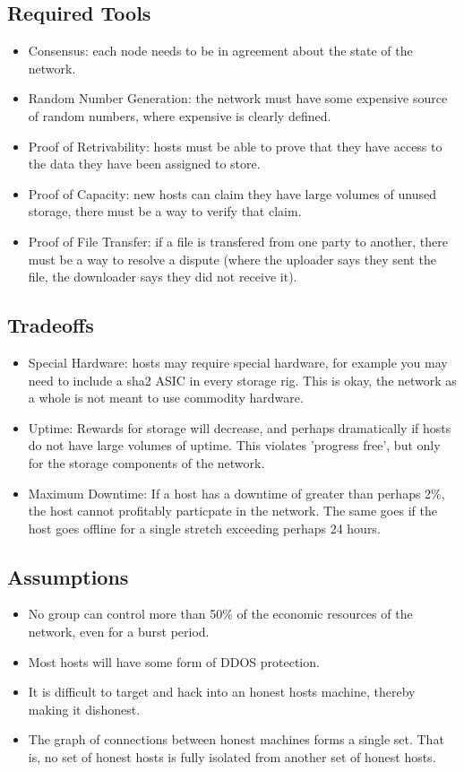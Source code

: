 \documentclass[twocolumn]{article}
\begin{document}
\subsection{Required Tools}
\begin{itemize}
	\item Consensus: each node needs to be in agreement about the state of the network.
	\item Random Number Generation: the network must have some expensive source of random numbers, where expensive is clearly defined.
	\item Proof of Retrivability: hosts must be able to prove that they have access to the data they have been assigned to store.
	\item Proof of Capacity: new hosts can claim they have large volumes of unused storage, there must be a way to verify that claim.
	\item Proof of File Transfer: if a file is transfered from one party to another, there must be a way to resolve a dispute (where the uploader says they sent the file, the downloader says they did not receive it).
\end{itemize}

\subsection{Tradeoffs}
\begin{itemize}
	\item Special Hardware: hosts may require special hardware, for example you may need to include a sha2 ASIC in every storage rig. This is okay, the network as a whole is not meant to use commodity hardware.
	\item Uptime: Rewards for storage will decrease, and perhaps dramatically if hosts do not have large volumes of uptime. This violates 'progress free', but only for the storage components of the network.
	\item Maximum Downtime: If a host has a downtime of greater than perhaps 2\%, the host cannot profitably particpate in the network. The same goes if the host goes offline for a single stretch exceeding perhaps 24 hours.
\end{itemize}

\subsection{Assumptions}
\begin{itemize}
	\item No group can control more than 50\% of the economic resources of the network, even for a burst period.
	\item Most hosts will have some form of DDOS protection.
	\item It is difficult to target and hack into an honest hosts machine, thereby making it dishonest.
	\item The graph of connections between honest machines forms a single set. That is, no set of honest hosts is fully isolated from another set of honest hosts.
\end{itemize}
\end{document}
